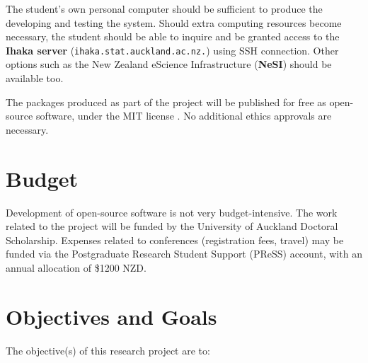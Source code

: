 \documentclass[12pt,a4paper]{article}
\begin{document}
The student's own personal computer should be sufficient to produce the developing and testing the system. Should extra computing resources become necessary, the student should be able to inquire and be granted access to the \textbf{Ihaka server} (\texttt{ihaka.stat.auckland.ac.nz.}) using SSH connection. Other options such as the New Zealand eScience Infrastructure (\textbf{NeSI}) should be available too. 

The packages produced as part of the project will be published for free as open-source software, under the MIT license \citep{mit2023}. No additional ethics approvals are necessary. 

\section{Budget}

Development of open-source software is not very budget-intensive. The work related to the project will be funded by the University of Auckland Doctoral Scholarship. Expenses related to conferences (registration fees, travel) may be funded via the Postgraduate Research Student Support (PReSS) account, with an annual allocation of \$1200 NZD. 

\section{Objectives and Goals}
\label{sec:goals}


The objective(s) of this research project are to:
\end{document}
